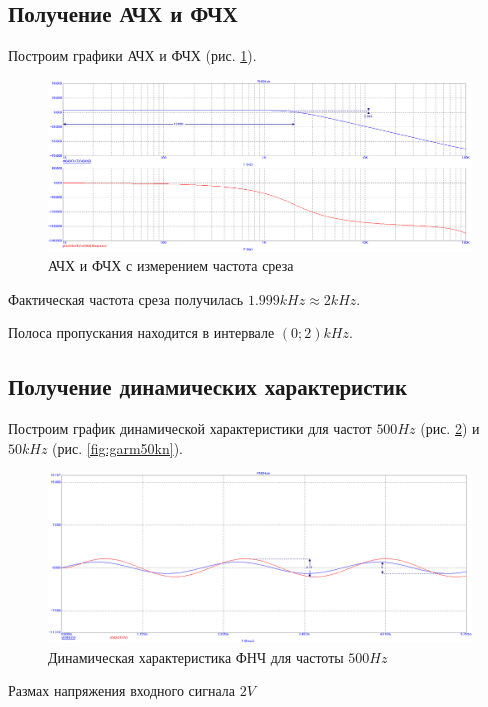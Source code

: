 \documentclass[a4paper,14pt]{article}
\begin{document}
\subsection{Получение АЧХ и ФЧХ}

Построим графики АЧХ и ФЧХ (рис. \ref{fig:afchn}).

\begin{figure}[H]
	\centering
	\includegraphics[width=0.85\linewidth]{../imgs/FNCH/AFcH_N}
	\caption{АЧХ и ФЧХ с измерением частота среза}
	\label{fig:afchn}
\end{figure}

Фактическая частота среза получилась $1.999kHz \approx 2kHz$.

Полоса пропускания находится в интервале $(0;2)kHz$.

\subsection{Получение динамических характеристик}

Построим график динамической характеристики для частот $500Hz$ (рис. \ref{fig:garm500n}) и $50kHz$ (рис. \ref{fig:garm50kn}).

\begin{figure}[H]
	\centering
	\includegraphics[width=0.95\linewidth]{../imgs/FNCH/garm_500_N}
	\caption{Динамическая характеристика ФНЧ для частоты $500Hz$}
	\label{fig:garm500n}
\end{figure}

Размах напряжения входного сигнала $2V$
\end{document}

